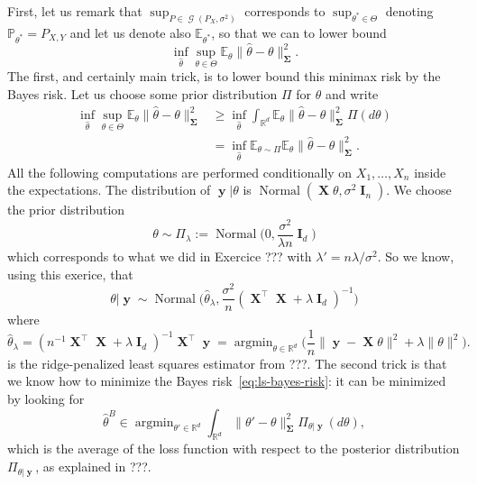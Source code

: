 \documentclass[
	fontsize=11pt, %
	twoside=false, %
	numbers=noenddot, %
]{kaobook}
\DeclareMathOperator{\cG}{{\mathcal G}}
\DeclareMathOperator{\bI}{{\boldsymbol I}}
\DeclareMathOperator{\bX}{{\boldsymbol X}}
\DeclareMathOperator{\by}{{\boldsymbol y}}
\DeclareMathOperator{\bSigma}{\boldsymbol \Sigma}
\DeclareMathOperator{\nor}{Normal}
\DeclareMathOperator*{\argmin}{argmin}
\renewcommand{\P}{\mathbb P}
\newcommand{\E}{\mathbb E}
\newcommand{\R}{\mathbb R}
\newcommand{\wh}{\widehat}
\newcommand{\norm}[1]{\| #1 \|}
\begin{document}
First, let us remark that $\sup_{P \in \cG(P_X, \sigma^2)}$ corresponds to $\sup_{\theta^* \in \Theta}$ denoting $\P_{\theta^*} = P_{X, Y}$ and let us denote also $\E_{\theta^*}$, so that we can to lower bound
\begin{equation*}
	\inf_{\wh \theta} \sup_{\theta \in \Theta} \E_\theta \norm{\wh \theta - \theta}_{\bSigma}^2.
\end{equation*}
The first, and certainly main trick, is to lower bound this minimax risk by the Bayes risk. Let us choose some prior distribution $\Pi$ for $\theta$ and write
\begin{align}
	\nonumber
	\inf_{\wh \theta} \sup_{\theta \in \Theta} \E_\theta \norm{\wh \theta - \theta}_{\bSigma}^2 
	&\geq \inf_{\wh \theta} \int_{\R^d} \E_\theta \norm{\wh \theta - \theta}_{\bSigma}^2 \Pi(d \theta) \\
	\label{eq:ls-bayes-risk}
	&= \inf_{\wh \theta} \E_{\theta \sim \Pi} \E_\theta \norm{\wh \theta - \theta}_{\bSigma}^2.
\end{align}
All the following computations are performed conditionally on $X_1, \ldots, X_n$ inside the expectations.
The distribution of $\by | \theta$ is $\nor(\bX \theta, \sigma^2 \bI_n)$. We choose the prior distribution
\begin{equation*}
	\theta \sim \Pi_\lambda := \nor\Big( 0, \frac{\sigma^2}{\lambda n} \bI_d \Big)
\end{equation*}
which corresponds to what we did in Exercice ??? with $\lambda' = n \lambda / \sigma^2$.
So we know, using this exerice, that 
\begin{equation*}
	\theta | \by \sim \nor\Big( \wh \theta_\lambda, \frac{\sigma^2}{n} (\bX^\top \bX + \lambda \bI_d)^{-1} \Big)
\end{equation*}
where
\begin{equation*}
	\wh \theta_\lambda = (n^{-1} \bX^\top \bX + \lambda \bI_d)^{-1} \bX^\top \by = \argmin_{\theta \in \R^d} \Big( \frac 1n \norm{\by - \bX \theta}^2 + \lambda \norm{\theta}^2 \Big).
\end{equation*}
is the ridge-penalized least squares estimator from ???.
The second trick is that we know how to minimize the Bayes risk~\eqref{eq:ls-bayes-risk}: it can be minimized by looking for
\begin{equation*}
	\wh \theta^B \in \argmin_{\theta' \in \R^d} \int_{\R^d} \norm{\theta' - \theta}_{\bSigma}^2 \Pi_{\theta | \by}(d \theta),
\end{equation*}
which is the average of the loss function with respect to the posterior distribution $\Pi_{\theta | \by}$, as explained in ???.
\end{document}
